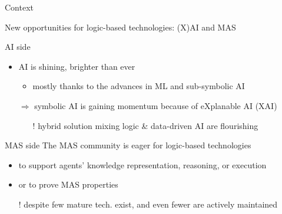 \documentclass[presentation]{beamer}
\begin{document}
\begin{frame}[c]{Context}
	
	New opportunities for logic-based technologies: (X)AI and MAS
	
	\vfill

    \begin{block}{AI side}
        \begin{itemize}
            \item AI is shining, brighter than ever
            \begin{itemize}
                \item mostly thanks to the advances in ML and sub-symbolic AI
            \end{itemize}

            \item[$\Rightarrow$] symbolic AI is gaining momentum because of eXplanable AI (XAI)
            \begin{itemize}
                \item[!] hybrid solution mixing logic \& data-driven AI are flourishing 
            \end{itemize}
        \end{itemize}
    \end{block}

	\vfill

    \begin{block}{MAS side}
        The MAS community is eager for logic-based technologies 
        \begin{itemize}
            \item to support agents' knowledge representation, reasoning, or execution

            \item or to prove MAS properties

            \item[!] despite few mature tech. exist, and even fewer are actively maintained
        \end{itemize}
    \end{block}
\end{frame}
\end{document}
